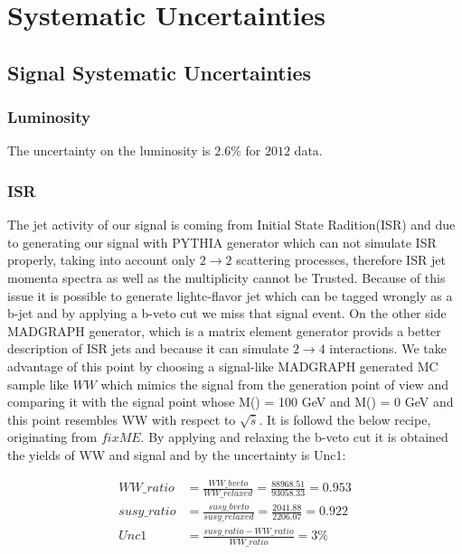 \section{Systematic Uncertainties}
\label{sect:sys}
\subsection{Signal Systematic Uncertainties}
\subsubsection{Luminosity}
The uncertainty on the luminosity  is $2.6\%$ for $2012$ data.

\subsubsection{ISR}
The jet activity of our signal is coming from Initial State Radition(ISR) and due to generating our signal with PYTHIA generator which can not simulate ISR properly, taking into account only $2 \rightarrow 2$ scattering processes, therefore ISR jet momenta spectra as well as the multiplicity cannot be Trusted. Because of this issue it is possible to generate lightc-flavor jet which can be tagged wrongly as a b-jet and by applying a b-veto cut we miss that signal event. On the other side MADGRAPH generator, which is a matrix element generator provids a better description of ISR jets and because it can simulate $2 \rightarrow 4$ interactions. 
We take advantage of this point by choosing a signal-like MADGRAPH generated MC sample like $WW$ which mimics the signal from the generation point of view and comparing it with the signal point whose M(\chione) = 100 GeV and M(\neutralino) = 0 GeV and this point resembles WW with respect to $\sqrt {\hat{s}}$. It is followd the below recipe, originating from $fixME$.
By applying and relaxing the b-veto cut it is obtained the yields of WW and signal and by the uncertainty is Unc1:


\begin{align}
WW\_ratio &= \frac{WW\_bveto}{WW\_relaxed} = \frac{88968.51}{93058.33} = 0.953\\ \nonumber
susy\_ratio &= \frac{susy\_bveto}{susy\_relaxed} = \frac{2041.88}{2206.07} = 0.922 \\ \nonumber
Unc1 &= \frac{susy\_ratio - WW\_ratio}{WW\_ratio} = 3 \% 
\end{align}


